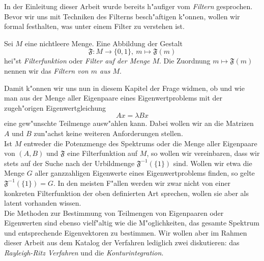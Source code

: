 In der Einleitung dieser Arbeit wurde bereits h"aufiger vom \emph{Filtern} gesprochen.
Bevor wir uns mit Techniken des Filterns besch"aftigen k"onnen, wollen wir formal festhalten, was unter einem Filter zu verstehen ist.

\begin{defn}[Filter]\label{defn:chap3:filter}
Sei $M$ eine nichtleere Menge. Eine Abbildung der Gestalt
\[
\mathfrak{F}\colon M \to \{0,1\},\ %
m\mapsto\mathfrak{F}(m)
\]
hei"st \emph{Filterfunktion} oder \emph{Filter auf der Menge $M$}. Die Zuordnung $m\mapsto\mathfrak{F}(m)$ nennen wir das \emph{Filtern von $m$ aus $M$}.
\end{defn}

Damit k"onnen wir uns nun in diesem Kapitel der Frage widmen, ob und wie man aus der Menge aller Eigenpaare eines Eigenwertproblems mit der zugeh"origen Eigenwertgleichung
\[
Ax = \lambda Bx
\]
eine gew"unschte Teilmenge ausw"ahlen kann.
Dabei wollen wir an die Matrizen $A$ und $B$ zun"achst keine weiteren Anforderungen stellen.\\

Ist $M$ entweder die Potenzmenge des Spektrums oder die Menge aller Eigenpaare von $(A,B)$ und $\mathfrak{F}$ eine Filterfunktion auf $M$, so wollen wir vereinbaren, dass wir stets auf der Suche nach der Urbildmenge $\mathfrak{F}^{-1}(\{ 1\})$ sind.
Wollen wir etwa die Menge $G$ aller ganzzahligen Eigenwerte eines Eigenwertproblems finden, so gelte $\mathfrak{F}^{-1}(\{1\}) = G$. In den meisten F"allen werden wir zwar nicht von einer konkreten Filterfunktion der oben definierten Art sprechen, wollen sie aber als latent vorhanden wissen.\\

Die Methoden zur Bestimmung von Teilmengen von Eigenpaaren oder Eigenwerten sind ebenso vielf"altig wie die M"oglichkeiten, das gesamte Spektrum und entsprechende Eigenvektoren zu bestimmen.
Wir wollen aber im Rahmen dieser Arbeit aus dem Katalog der Verfahren lediglich zwei diskutieren: das \emph{Rayleigh-Ritz Verfahren} und die \emph{Konturintegration}.

\newpage


